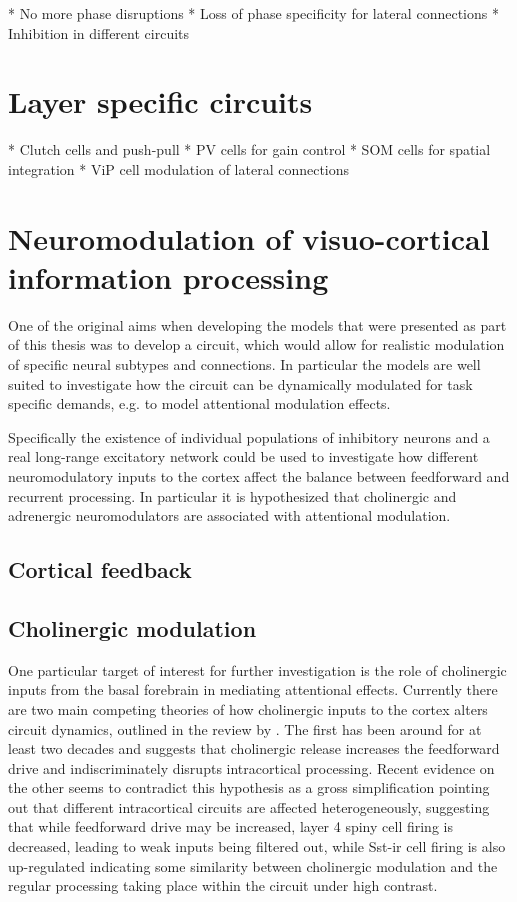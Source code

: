 * No more phase disruptions
* Loss of phase specificity for lateral connections
* Inhibition in different circuits

\section{Layer specific circuits}

* Clutch cells and push-pull
* PV cells for gain control
* SOM cells for spatial integration
* ViP cell modulation of lateral connections

\section{Neuromodulation of visuo-cortical information processing}

One of the original aims when developing the models that were
presented as part of this thesis was to develop a circuit, which would
allow for realistic modulation of specific neural subtypes and
connections. In particular the models are well suited to investigate
how the circuit can be dynamically modulated for task specific
demands, e.g. to model attentional modulation effects.

Specifically the existence of individual populations of inhibitory
neurons and a real long-range excitatory network could be used to
investigate how different neuromodulatory inputs to the cortex affect
the balance between feedforward and recurrent processing. In
particular it is hypothesized that cholinergic and adrenergic
neuromodulators are associated with attentional modulation.

\subsection{Cortical feedback}




\subsection{Cholinergic modulation}

One particular target of interest for further investigation is the
role of cholinergic inputs from the basal forebrain in mediating
attentional effects. Currently there are two main competing theories
of how cholinergic inputs to the cortex alters circuit dynamics,
outlined in the review by \cite{Thiele2013}. The first has been around
for at least two decades and suggests that cholinergic release
increases the feedforward drive and indiscriminately disrupts
intracortical processing. Recent evidence on the other seems to
contradict this hypothesis as a gross simplification pointing out that
different intracortical circuits are affected heterogeneously,
suggesting that while feedforward drive may be increased, layer 4
spiny cell firing is decreased, leading to weak inputs being filtered
out, while Sst-ir cell firing is also up-regulated indicating some
similarity between cholinergic modulation and the regular processing
taking place within the circuit under high contrast.

